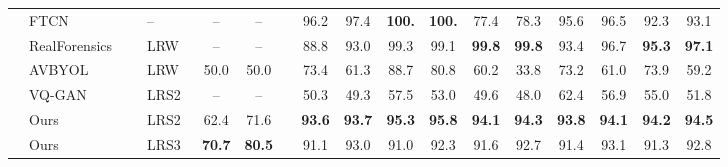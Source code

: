 \documentclass[10pt,twocolumn,letterpaper]{article}
\makeatletter
\def\adl@drawiv#1#2#3{\hskip.5\tabcolsep
        \xleaders#3{#2.5\@tempdimb #1{1}#2.5\@tempdimb}#2\z@ plus1fil minus1fil\relax
        \hskip.5\tabcolsep}
\newcommand{\cdashlinelr}[1]{\noalign{\vskip\aboverulesep
           \global\let\@dashdrawstore\adl@draw
           \global\let\adl@draw\adl@drawiv}
  \cdashline{#1}
  \noalign{\global\let\adl@draw\@dashdrawstore
           \vskip\belowrulesep}}
\makeatother
\begin{document}
\begin{table*}[t!]
{\begin{tabular}{clclccccccccccc:cc}
& FTCN~\cite{zheng2021exploring}                                   &                              &          --                                                                     &    --        &   --       &   &   96.2    &      97.4       &    \textbf{100.}          &      \textbf{100.}        &      77.4       &       78.3    &    95.6       &    96.5    & 92.3 &   93.1    \\
& RealForensics~\cite{haliassos2022leveraging}                         &                              & LRW~\cite{Chung16}                                                                          &   --        &  --   &  &   88.8      &     93.0          &      99.3       &         99.1    &           \textbf{99.8}     &       \textbf{99.8}      &   93.4          &     96.7  & \textbf{95.3} & \textbf{97.1}       \\
\cmidrule(lr){1-17}
\parbox[t]{4mm}{} 
& AVBYOL~\cite{haliassos2022leveraging,grill2020bootstrap}               &                                                      & LRW~\cite{Chung16}                                                                         &    50.0        &      50.0 &  & 73.4  &       61.3      &     88.7     &  80.8 &  60.2     &      33.8            &   73.2         & 61.0 & 73.9  & 59.2 \\
& VQ-GAN ~\cite{esser2021taming}                                 &                         & LRS2~\cite{Afouras18c}                                                                        & --       &     --  &   &  50.3     &   49.3       & 57.5  &   53.0      &    49.6      &     48.0    &     62.4        &  56.9  &  55.0 & 51.8  \\
\cdashlinelr{2-17}
& Ours                &                                                   & LRS2~\cite{Afouras18c}                                                                         &      62.4    &  71.6    &    &     \textbf{93.6}         &     \textbf{93.7}    &  \textbf{95.3} &    \textbf{95.8}     &       \textbf{94.1}       &       \textbf{94.3}       &   \textbf{93.8}           & \textbf{94.1}  &\textbf{94.2} & \textbf{94.5}  \\
& Ours                &                                                   & LRS3~\cite{afouras2018lrs3}        &      \textbf{70.7}      &     \textbf{80.5} &     &     91.1         &    93.0         &   91.0   &  92.3        &   91.6           &      92.7       &   91.4           & 93.1   & 91.3 & 92.8\\ 

\end{tabular}}
\end{table*}
\end{document}
